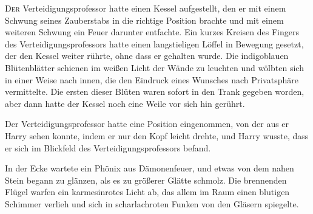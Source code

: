 
\lettrine{D}{er} Verteidigungsprofessor hatte einen Kessel aufgestellt, den er mit einem Schwung seines Zauberstabs in die richtige Position brachte und mit einem weiteren Schwung ein Feuer darunter entfachte. Ein kurzes Kreisen des Fingers des Verteidigungsprofessors hatte einen langstieligen Löffel in Bewegung gesetzt, der den Kessel weiter rührte, ohne dass er gehalten wurde. Die indigoblauen Blütenblätter schienen im weißen Licht der Wände zu leuchten und wölbten sich in einer Weise nach innen, die den Eindruck eines Wunsches nach Privatsphäre vermittelte. Die ersten dieser Blüten waren sofort in den Trank gegeben worden, aber dann hatte der Kessel noch eine Weile vor sich hin gerührt.

Der Verteidigungsprofessor hatte eine Position eingenommen, von der aus er Harry sehen konnte, indem er nur den Kopf leicht drehte, und Harry wusste, dass er sich im Blickfeld des Verteidigungsprofessors befand.

In der Ecke wartete ein Phönix aus Dämonenfeuer, und etwas von dem nahen Stein begann zu glänzen, als es zu größerer Glätte schmolz. Die brennenden Flügel warfen ein karmesinrotes Licht ab, das allem im Raum einen blutigen Schimmer verlieh und sich in scharlachroten Funken von den Gläsern spiegelte.

